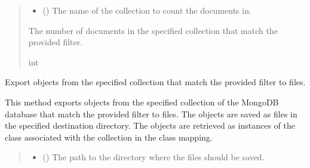 \documentclass[letterpaper,10pt,english]{sphinxmanual}
\begin{document}
\begin{fulllineitems}
\begin{fulllineitems}
\begin{quote}
\begin{description}
\begin{itemize}
\item {} 
\sphinxAtStartPar
{} () \textendash{} The name of the collection to count the documents in.

\end{itemize}

\sphinxAtStartPar
The number of documents in the specified collection that match the provided filter.

\sphinxAtStartPar
int

\end{description}\end{quote}

\end{fulllineitems}


\begin{fulllineitems}
\label{\detokenize{forensicfit.database.database:forensicfit.database.database.Database.export_to_files}}
\pysigstartsignatures
{}
\pysigstopsignatures
\sphinxAtStartPar
Export objects from the specified collection that match the provided filter to files.

\sphinxAtStartPar
This method exports objects from the specified collection of the MongoDB database that match
the provided filter to files. The objects are saved as files in the specified destination
directory. The objects are retrieved as instances of the class associated with the collection
in the class mapping.
\begin{quote}\begin{description}
\begin{itemize}
\item {} 
\sphinxAtStartPar
{} () \textendash{} The path to the directory where the files should be saved.


\end{itemize}
\end{description}
\end{quote}
\end{fulllineitems}
\end{fulllineitems}
\end{document}
